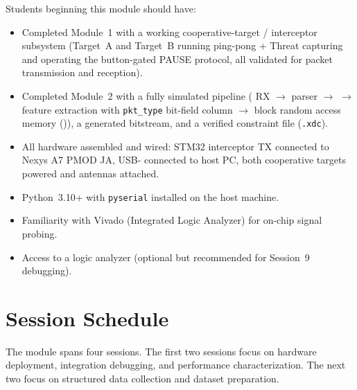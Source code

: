 \documentclass[11pt,letterpaper]{article}
\begin{document}
	Students beginning this module should have:
	\begin{itemize}[leftmargin=2em]
		\item Completed Module~1 with a working cooperative-target / interceptor \RF{} subsystem (Target~A and Target~B running ping-pong + Threat capturing and operating the button-gated PAUSE protocol, all validated for packet transmission and reception).
		\item Completed Module~2 with a fully simulated \FPGA{} pipeline (\UART{} RX $\rightarrow$ parser $\rightarrow$ \CRC{} $\rightarrow$ feature extraction with \texttt{pkt\_type} bit-field column $\rightarrow$ block random access memory (\BRAM{})), a generated bitstream, and a verified constraint file (\texttt{.xdc}).
		\item All hardware assembled and wired: STM32 interceptor \UART{} TX connected to Nexys A7 PMOD JA, \FPGA{} USB-\UART{} connected to host PC, both cooperative targets powered and antennas attached.
		\item Python~3.10+ with \texttt{pyserial} installed on the host machine.
		\item Familiarity with Vivado \ILA{} (Integrated Logic Analyzer) for on-chip signal probing.
		\item Access to a logic analyzer (optional but recommended for Session~9 debugging).
	\end{itemize}

	\newpage
	\section{Session Schedule}

	The module spans four sessions. The first two sessions focus on hardware deployment, integration debugging, and performance characterization. The next two focus on structured data collection and dataset preparation.
\end{document}
